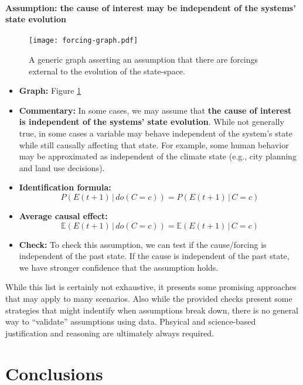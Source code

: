 \documentclass[12pt]{article}
\begin{document}
\newpage

\paragraph{Assumption: the cause of interest may be independent of the
  systems' state evolution}

\begin{figure} \texttt{[image: forcing-graph.pdf]}
  \caption{A generic graph asserting an assumption that there are
    forcings external to the evolution of the state-space.}
  \label{fig:forcing}
\end{figure}

\begin{itemize}
\item \textbf{Graph:} Figure \ref{fig:forcing}
\item \textbf{Commentary:} In some cases, we may assume that
  \textbf{the cause of interest is independent of the systems' state
    evolution}. While not generally true, in some cases a variable may
  behave independent of the system's state while still causally
  affecting that state. For example, some human behavior may be
  approximated as independent of the climate state (e.g., city
  planning and land use decisions).
\item \textbf{Identification formula:}
  \begin{equation*}
    P(E(t+1) \, | \, do(C = c)) = P(E(t+1) \, | \, C = c)
  \end{equation*}
\item \textbf{Average causal effect:}
  \begin{equation*}
    \mathbb{E}(E(t+1) \, | \, do(C = c)) = \mathbb{E}(E(t+1) \, | \, C=c)
  \end{equation*}
\item \textbf{Check:} To check this assumption, we can test if the
  cause/forcing is independent of the past state. If the cause is
  independent of the past state, we have stronger confidence that the
  assumption holds.
\end{itemize}

While this list is certainly not exhaustive,
it presents some promising approaches that may apply to many
scenarios. Also while the provided checks present some strategies that
might indentify when assumptions break down, there is no general way
to ``validate'' assumptions using data. Phsyical and science-based
justification and reasoning are ultimately always required.

\section{Conclusions}
\end{document}
